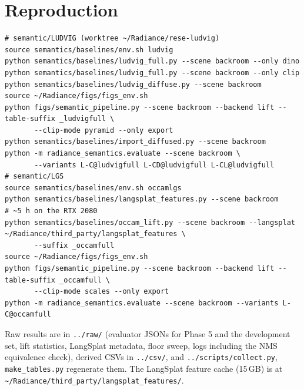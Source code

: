 \documentclass[11pt,a4paper]{article}
\newcommand{\code}[1]{\texttt{\small #1}}
\begin{document}
\section{Reproduction}
{\scriptsize
\begin{verbatim}
# semantic/LUDVIG (worktree ~/Radiance/rese-ludvig)
source semantics/baselines/env.sh ludvig
python semantics/baselines/ludvig_full.py --scene backroom --only dino
python semantics/baselines/ludvig_full.py --scene backroom --only clip
python semantics/baselines/ludvig_diffuse.py --scene backroom
source ~/Radiance/figs/figs_env.sh
python figs/semantic_pipeline.py --scene backroom --backend lift --table-suffix _ludvigfull \
       --clip-mode pyramid --only export
python semantics/baselines/import_diffused.py --scene backroom
python -m radiance_semantics.evaluate --scene backroom \
       --variants L-C@ludvigfull L-CD@ludvigfull L-CL@ludvigfull
# semantic/LGS
source semantics/baselines/env.sh occamlgs
python semantics/baselines/langsplat_features.py --scene backroom            # ~5 h on the RTX 2080
python semantics/baselines/occam_lift.py --scene backroom --langsplat ~/Radiance/third_party/langsplat_features \
       --suffix _occamfull
source ~/Radiance/figs/figs_env.sh
python figs/semantic_pipeline.py --scene backroom --backend lift --table-suffix _occamfull \
       --clip-mode scales --only export
python -m radiance_semantics.evaluate --scene backroom --variants L-C@occamfull
\end{verbatim}
}
\noindent Raw results are in \code{../raw/} (evaluator JSONs for Phase 5 and the development set, lift statistics,
LangSplat metadata, floor sweep, logs including the NMS equivalence check), derived CSVs in \code{../csv/}, and
\code{../scripts/collect.py}, \code{make\_tables.py} regenerate them. The LangSplat feature cache (15\,GB) is at
\code{\textasciitilde/Radiance/third\_party/langsplat\_features/}.
\end{document}
